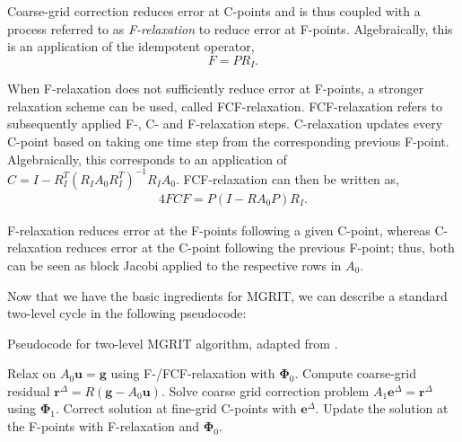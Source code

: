 \documentclass[3p]{elsarticle}
\begin{document}
Coarse-grid correction reduces error at C-points
and is thus coupled with a process referred to as \emph{F-relaxation} to reduce error at F-points.
Algebraically, this is an application of the idempotent operator,
\begin{equation}
    F = P R_I.
    \label{F-relaxation-eqn}
\end{equation}

When F-relaxation does not sufficiently reduce error at F-points,
a stronger relaxation scheme can be used, called FCF-relaxation.
FCF-relaxation refers to subsequently applied F-, C- and F-relaxation steps.
C-relaxation updates every C-point based on taking one time step from the corresponding previous F-point.
Algebraically, this corresponds to an application of $C = I - R_I^T (R_I A_0 R_I^T)^{-1} R_I A_0$.
FCF-relaxation can then be written as,
\begin{alignat}{4}
    F C F = P (I - R A_0 P) R_I.
    \label{FCF-relaxation-eqn}
\end{alignat}

F-relaxation reduces error at the F-points following a given C-point,
whereas C-relaxation reduces error at the C-point following the previous F-point;
thus, both can be seen as block Jacobi applied to the respective rows in $A_0$.

Now that we have the basic ingredients for MGRIT, we can describe a standard two-level cycle in the following pseudocode:
\FloatBarrier
\begin{algorithm}
  \caption{Pseudocode for two-level MGRIT algorithm, adapted from \cite{DobrevKolevPeterssonSchroder2017}.}
  \label{linelas-MGRIT-V-alg}
  \begin{algorithmic}[1]
    \item[]
    \Repeat
      \State Relax on $A_0 \boldsymbol{u} = \boldsymbol{g}$ using F-/FCF-relaxation with $\boldsymbol{\Phi}_0$. 
      \State Compute coarse-grid residual $\boldsymbol{r}^\Delta  = R (\boldsymbol{g} - A_0 \boldsymbol{u})$.\label{linelas-MGRIT-V-restriction-alg}
      \State Solve coarse grid correction problem $A_1 \boldsymbol{e}^{\Delta} = \boldsymbol{r}^\Delta$
      using $\boldsymbol{\Phi}_1$. \label{linelas-MGRIT-V-recursive-step-alg}
      \State Correct solution at fine-grid C-points with $\boldsymbol{e}^{\Delta}$. 
      \State Update the solution at the F-points with F-relaxation and $\boldsymbol{\Phi}_0$. 
  \end{algorithmic}
\end{algorithm}
\FloatBarrier
\end{document}
